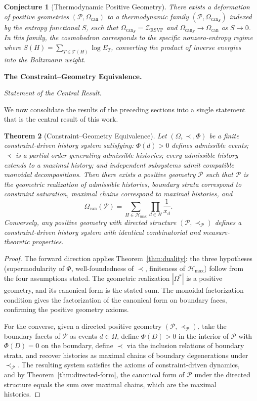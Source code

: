 \documentclass[12pt, oneside]{amsart}
\theoremstyle{plain}
\newtheorem{theorem}{Theorem}[section]
\newtheorem{conjecture}[theorem]{Conjecture}
\theoremstyle{definition}
\theoremstyle{remark}
\newcommand{\Phif}{\Phi}
\newcommand{\Sf}{S}
\newcommand{\OmKS}{\Omega}
\newcommand{\CF}{\Omega_{\mathrm{can}}}
\newcommand{\ZRSVP}{\mathcal{Z}_{\mathrm{RSVP}}}
\newcommand{\Hmax}{\mathcal{H}_{\max}}
\begin{document}
\begin{conjecture}[Thermodynamic Positive Geometry]
There exists a deformation of positive geometries $(\mathcal{P}, \CF)$ to a thermodynamic family $(\mathcal{P}, \CF_{\Sf})$ indexed by the entropy functional $\Sf$, such that $\CF_{\Sf} = \ZRSVP$ and $\CF_{\Sf} \to \CF$ as $\Sf \to 0$. In this family, the cosmohedron corresponds to the specific nonzero-entropy regime where $\Sf(H) = \sum_{T \in \mathcal{T}(H)} \log E_T$, converting the product of inverse energies into the Boltzmann weight.
\end{conjecture}

\bigskip\noindent\textbf{The Constraint--Geometry Equivalence.}
\label{sec:master}

\medskip\noindent\textit{Statement of the Central Result.}

We now consolidate the results of the preceding sections into a single statement that is the central result of this work.

\begin{theorem}[Constraint--Geometry Equivalence]
\label{thm:master}
Let $(\OmKS, \prec, \Phif)$ be a finite constraint-driven history system satisfying: $\Phif(d) > 0$ defines admissible events; $\prec$ is a partial order generating admissible histories; every admissible history extends to a maximal history; and independent subsystems admit compatible monoidal decompositions. Then there exists a positive geometry $\mathcal{P}$ such that $\mathcal{P}$ is the geometric realization of admissible histories, boundary strata correspond to constraint saturation, maximal chains correspond to maximal histories, and
\[
  \CF(\mathcal{P}) = \sum_{H \in \Hmax} \prod_{d \in H} \frac{1}{x_d}.
\]
Conversely, any positive geometry with directed structure $(\mathcal{P}, \prec_{\mathcal{P}})$ defines a constraint-driven history system with identical combinatorial and measure-theoretic properties.
\end{theorem}

\begin{proof}
The forward direction applies Theorem~\ref{thm:duality}: the three hypotheses (supermodularity of $\Phif$, well-foundedness of $\prec$, finiteness of $\Hmax$) follow from the four assumptions stated. The geometric realization $|\OmKS^*|$ is a positive geometry, and its canonical form is the stated sum. The monoidal factorization condition gives the factorization of the canonical form on boundary faces, confirming the positive geometry axioms.

For the converse, given a directed positive geometry $(\mathcal{P}, \prec_{\mathcal{P}})$, take the boundary facets of $\mathcal{P}$ as events $d \in \OmKS$, define $\Phif(D) > 0$ in the interior of $\mathcal{P}$ with $\Phif(D) = 0$ on the boundary, define $\prec$ via the inclusion relations of boundary strata, and recover histories as maximal chains of boundary degenerations under $\prec_{\mathcal{P}}$. The resulting system satisfies the axioms of constraint-driven dynamics, and by Theorem~\ref{thm:directed-form}, the canonical form of $\mathcal{P}$ under the directed structure equals the sum over maximal chains, which are the maximal histories.
\end{proof}
\end{document}
